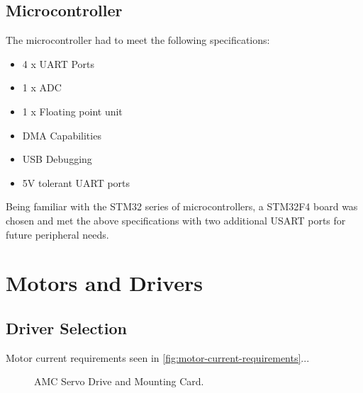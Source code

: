 \subsection{Microcontroller}
The microcontroller had to meet the following specifications:
\begin{itemize}
\item 4 x UART Ports
\item 1 x ADC
\item 1 x Floating point unit
\item DMA Capabilities
\item USB Debugging
\item 5V tolerant UART ports
\end{itemize}

Being familiar with the STM32 series of microcontrollers, a STM32F4 board was chosen and met the above specifications with two additional USART ports for future peripheral needs.

\section{Motors and Drivers}

\subsection{Driver Selection}

Motor current requirements seen in \cref{fig:motor-current-requirements}...

\begin{figure}
\centering
{}
\caption{AMC Servo Drive and Mounting Card.}
\label{fig:AMC Servo Drive and Mounting Card}
\end{figure}

